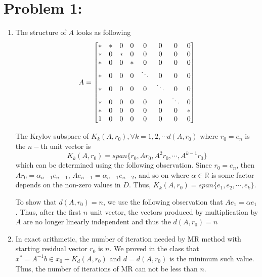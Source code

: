 \section*{Problem 1:}
\begin{enumerate}
\item The structure of $A$ looks as following 
$$
A = 
\setcounter{MaxMatrixCols}{11}
\begin{bmatrix}
* & * & 0 & 0 & 0 & 0 & 0 & 0\\
* & 0 & * & 0 & 0 & 0 & 0 & 0\\
* & 0 & 0 & * & 0 & 0 & 0 & 0\\
* & 0 & 0 & 0 & \ddots & 0 & 0 & 0\\
* & 0 & 0 & 0 & 0 & \ddots & 0 & 0\\
* & 0 & 0 & 0 & 0 & 0 & \ddots & 0\\
* & 0 & 0 & 0 & 0 & 0 & 0 & *\\
1 & 0 & 0 & 0 & 0 & 0 & 0 & 0\\
\end{bmatrix}
$$

The Krylov subspace of $K_{k}(A, r_{0}),  \forall k=1,2,\cdots d(A,r_{0})$ where $r_{0} = e_{n}$ is the $n-$th unit vector is 
$$
K_{k}(A, r_{0}) = span\{r_{0}, Ar_{0}, A^{2}r_{0}, \cdots, A^{k-1}r_{0} \}
$$
which can be determined using the following observation. Since $r_{0} = e_{n}$, then $Ar_{0} = \alpha_{n-1}e_{n-1}$, $Ae_{n-1} = \alpha_{n-1}e_{n-2}$, and so on where $\alpha \in \mathbb{R}$ is some factor depends on the non-zero values in $D$. Thus, $K_{k}(A,r_{0}) = span\{e_{1}, e_{2}, \cdots, e_{k}\}$.

To show that $d(A,r_{0}) = n$, we use the following observation that $Ae_{1} = \alpha e_{1}$. Thus, after the first $n$ unit vector, the vectors produced by multiplication by $A$ are no longer linearly independent and thus the $d(A, r_{0})=n$

\item In exact arithmetic, the number of iteration needed by MR method with starting residual vector $r_{0}$ is $n$. We proved in the class that $x^{*} = A^{-1}b \in x_{0}+ K_{d}(A,r_{0})$ and $d = d(A,r_{0})$ is the minimum such value. Thus, the number of iterations of MR can not be less than $n$. 


\end{enumerate}
